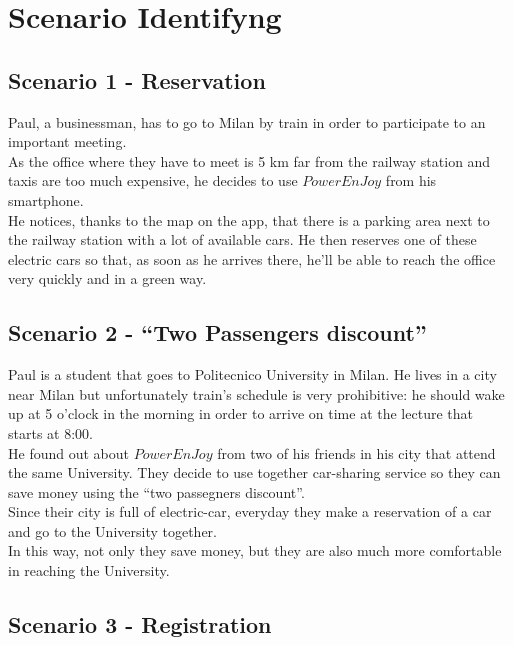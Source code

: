 
\section{Scenario Identifyng}

\subsection{Scenario 1 - Reservation}
\begin{flushleft}
Paul, a businessman, has to go to Milan by train in order to participate
to an important meeting.\\
As the office where they have to meet is 5 km far from the railway
station and taxis are too much expensive, he decides to use $\mathit{PowerEnJoy}$
from his smartphone. \\
He notices, thanks to the map on the app, that there is a parking
area next to the railway station with a lot of available cars. He
then reserves one of these electric cars so that, as soon as he arrives
there, he'll be able to reach the office very quickly and in a green
way. 
\par\end{flushleft}

\subsection{Scenario 2 - ``Two Passengers discount''}

Paul is a student that goes to Politecnico University in Milan. He
lives in a city near Milan but unfortunately train's schedule is very
prohibitive: he should wake up at 5 o'clock in the morning in order
to arrive on time at the lecture that starts at 8:00.\\
He found out about $\mathit{PowerEnJoy}$ from two of his friends
in his city that attend the same University. They decide to use together
car-sharing service so they can save money using the ``two passegners
discount''.\\
Since their city is full of electric-car, everyday they make a reservation
of a car and go to the University together.\\
In this way, not only they save money, but they are also much more
comfortable in reaching the University.

\subsection{Scenario 3 - Registration}

